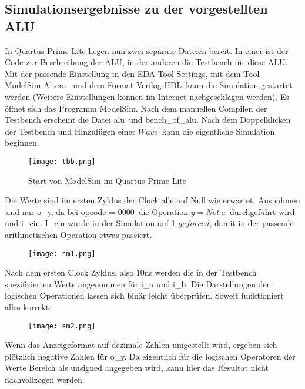 \documentclass[12pt,a4paper]{scrartcl}	%
\begin{document}
\subsection{Simulationsergebnisse zu der vorgestellten ALU}
In Quartus Prime Lite liegen nun zwei separate Dateien bereit. In einer ist der Code zur Beschreibung der ALU, in der anderen die Testbench für diese ALU. Mit der passende Einstellung in den \glqq EDA Tool Settings\grqq, mit dem Tool \glqq ModelSim-Altera\grqq~ und dem Format \glqq Verilog HDL\grqq~kann die Simulation gestartet werden (Weitere Einstellungen können im Internet nachgeschlagen werden). 
Es öffnet sich das Programm ModelSim. Nach dem manuellen Compilen der Testbench erscheint die Datei \glqq alu\grqq~und \glqq bench\_of\_alu\grqq. Nach dem Doppelklicken der Testbench und Hinzufügen einer $Wave$~kann die eigentliche Simulation beginnen.\\
\begin{figure}[htb]
	
	\texttt{[image: tbb.png]}
	\caption{Start von ModelSim im Quartus Prime Lite}
\end{figure}
Die Werte sind im ersten Zyklus der Clock alle auf Null wie erwartet. Ausnahmen sind nur o\_y, da bei \glqq opcode = 0000\grqq~die Operation $y = Not~a$~durchgeführt wird und i\_cin. I\_cin wurde in der Simulation auf 1 $geforced$, damit in der passende arithmetischen Operation etwas passiert.
\begin{figure}[htb]
	
	\texttt{[image: sm1.png]}
\end{figure}
Nach dem ersten Clock Zyklus, also 10ns werden die in der Testbench spezifizierten Werte angenommen für i\_a und i\_b. Die Darstellungen der logischen Operationen lassen sich binär leicht überprüfen. Soweit funktioniert alles korrekt.
\begin{figure}[h]
	
	\texttt{[image: sm2.png]}
\end{figure}
Wenn das Anzeigeformat auf dezimale Zahlen umgestellt wird, ergeben sich plötzlich negative Zahlen für o\_y. Da eigentlich für die logischen Operatoren der Werte Bereich als unsigned angegeben wird, kann hier das Resultat nicht nachvollzogen werden.\\
\end{document}
